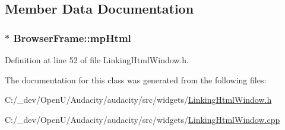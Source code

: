 \subsection{Member Data Documentation}
\subsubsection[{\texorpdfstring{mp\+Html}{mpHtml}}]{$\ast$ Browser\+Frame\+::mp\+Html}\hypertarget{class_browser_frame_a0abcac90e4463fd5657541cbeef71ae2}{}\label{class_browser_frame_a0abcac90e4463fd5657541cbeef71ae2}


Definition at line 52 of file Linking\+Html\+Window.\+h.



The documentation for this class was generated from the following files\+:\begin{DoxyCompactItemize}
\item 
C\+:/\+\_\+dev/\+Open\+U/\+Audacity/audacity/src/widgets/\hyperlink{_linking_html_window_8h}{Linking\+Html\+Window.\+h}\item 
C\+:/\+\_\+dev/\+Open\+U/\+Audacity/audacity/src/widgets/\hyperlink{_linking_html_window_8cpp}{Linking\+Html\+Window.\+cpp}\end{DoxyCompactItemize}
